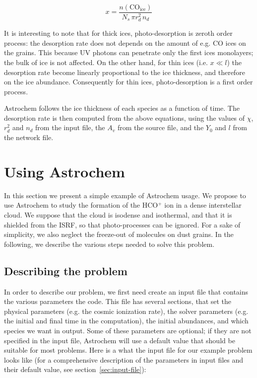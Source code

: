 \documentclass[a4paper,12pt]{article}
\newcommand{\conc}[1]{n(\mathrm{#1})}
\begin{document}
\begin{equation}
  x = \frac{\conc{CO_{ice}}}{N_{s} \, \pi r_{d}^2 \, n_{d}}
  \label{eq:ice-thickness}
\end{equation}

\noindent
It is interesting to note that for thick ices, photo-desorption is
zeroth order process: the desorption rate does not depends on the
amount of e.g. CO ices on the grains. This because UV photons can
penetrate only the first ices monolayers; the bulk of ice is not
affected. On the other hand, for thin ices (i.e. $x \ll l$) the
desorption rate become linearly proportional to the ice thickness, and
therefore on the ice abundance. Consequently for thin ices,
photo-desorption is a first order process.

Astrochem follows the ice thickness of each species as a function of
time. The desorption rate is then computed from the above equations,
using the values of $\chi$, $r_{d}^2$ and $n_{d}$ from the input file,
the $A_{v}$ from the source file, and the $Y_{0}$ and $l$ from the
network file.

\section{Using Astrochem}
\label{sec:using-astrochem}

In this section we present a simple example of Astrochem usage.  We
propose to use Astrochem to study the formation of the HCO$^{+}$ ion
in a dense interstellar cloud. We suppose that the cloud is isodense
and isothermal, and that it is shielded from the ISRF, so that
photo-processes can be ignored. For a sake of simplicity, we also
neglect the freeze-out of  molecules on dust grains. In the following,
we describe the various steps needed to solve this problem.

\subsection{Describing the problem}
\label{sec:describing-problem}

In order to describe our problem, we first need create an input file
that contains the various parameters the code. This file has several
sections, that set the physical parameters (e.g. the cosmic ionization
rate), the solver parameters (e.g. the initial and final time in the
computation), the initial abundances, and which species we want in
output. Some of these parameters are optional; if they are not
specified in the input file, Astrochem will use a default value that
should be suitable for most problems. Here is a what the input file
for our example problem looks like (for a comprehensive description of
the parameters in input files and their default value, see
section~\ref{sec:input-file}):
\end{document}
